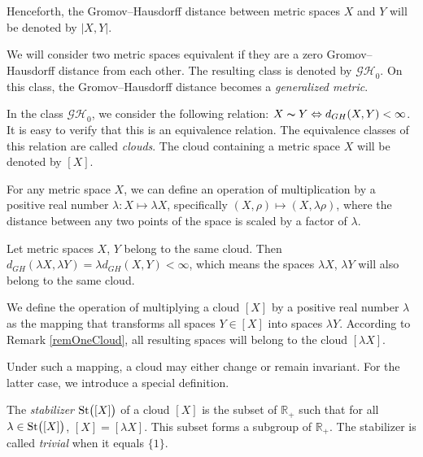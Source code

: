 \documentclass[leqno]{article}
\begin{document}
Henceforth, the Gromov--Hausdorff distance between metric spaces $ X $ and $ Y $ will be denoted by $ |X,Y| $.  

 We will consider two metric spaces equivalent if they are a zero Gromov--Hausdorff distance from each other. The resulting class is denoted by $ \mathcal{GH}_0 $. On this class, the Gromov--Hausdorff distance becomes a \emph{generalized metric}.  

\begin{defin}
In the class $\mathcal{GH}_{0}$, we consider the following relation: $X \thicksim Y \Leftrightarrow d_{GH}(X, Y) < \infty$. It is easy to verify that this is an equivalence relation. The equivalence classes of this relation are called \emph{clouds}. The cloud containing a metric space $X$ will be denoted by $[X]$.
\end{defin}

For any metric space $X$, we can define an operation of multiplication by a positive real number $\lambda\colon X\mapsto \lambda X$, specifically $(X, \rho) \mapsto (X, \lambda \rho)$, where the distance between any two points of the space is scaled by a factor of $\lambda$.

\begin{remark}
Let metric spaces $X$, $Y$ belong to the same cloud. Then $d_{GH}(\lambda X, \lambda Y) = \lambda d_{GH}(X,Y)\allowbreak < \infty$, which means the spaces $\lambda X$, $\lambda Y$ will also belong to the same cloud.
\label{remOneCloud}
\end{remark}

\begin{defin}
We define the operation of multiplying a cloud $[X]$ by a positive real number $\lambda$ as the mapping that transforms all spaces $Y \in [X]$ into spaces $\lambda Y$. According to Remark \ref{remOneCloud}, all resulting spaces will belong to the cloud $[\lambda X]$.
\end{defin}

Under such a mapping, a cloud may either change or remain invariant. For the latter case, we introduce a special definition.

\begin{defin}
The \emph{stabilizer} $\operatorname{St}\bigl([X]\bigr)$ of a cloud $[X]$ is the subset of $\mathbb{R}_+$ such that for all $\lambda \in \operatorname{St}\bigl([X]\bigr)$, $[X] = [\lambda X]$. This subset forms a subgroup of $\mathbb{R}_+$. The stabilizer is called \emph{trivial} when it equals $\{1\}$.
\end{defin}
\end{document}
